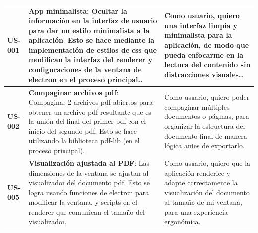 \begin{longtable}{|l||p{7cm}|p{4.5cm}|}
\textbf{US-001} & \textbf{App minimalista}: Ocultar la información en la interfaz de usuario para dar un estilo minimalista a la aplicación. Esto se hace mediante la implementación de estilos de css que modifican la interfaz del renderer y configuraciones de la ventana de electron en el proceso principal..& Como usuario, quiero una interfaz limpia y minimalista para la aplicación, de modo que pueda enfocarme en la lectura del contenido sin distracciones visuales..\\
\hline
\textbf{US-002} & \textbf{Compaginar archivos pdf}: Compaginar 2 archivos pdf abiertos para obtener un archivo pdf resultante que es la unión del final del primer pdf con el inicio del segundo pdf. Esto se hace utilizando la biblioteca pdf-lib (en el proceso principal).  & Como usuario, quiero poder compaginar múltiples documentos o páginas, para organizar la estructura del documento final de manera lógica antes de exportarlo.\\
\hline
\textbf{US-005} & \textbf{Visualización ajustada al PDF}: Las dimensiones de la ventana se ajustan al visualizador del documento pdf. Esto se logra usando funciones de electron para modificar la ventana, y scripts en el renderer que comunican el tamaño del visualizador. & Como usuario, quiero que la aplicación renderice y adapte correctamente la visualización del documento al tamaño de mi ventana, para una experiencia ergonómica.\\

\end{longtable}
